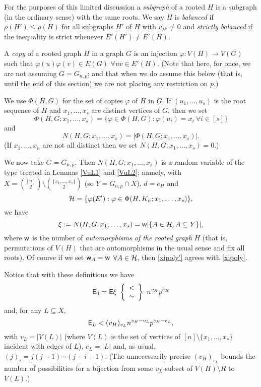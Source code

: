 \documentclass[letterpaper,11pt]{article}
\newcommand{\beq}[1]{\begin{equation}\label{#1}}
\newcommand{\enq}[0]{\end{equation}}
\newcommand{\sub}[0]{\subseteq}
\newcommand{\sm}[0]{\setminus}
\renewcommand{\dots}[0]{,\ldots,}
\newcommand{\h}[0]{{\cal H}}
\newcommand{\ra}[0]{\rightarrow}
\newcommand{\ww}{\mbox{{\sf w}}}
\newcommand{\0}[0]{\emptyset}
\newcommand{\C}[2]{{{#1}\choose{{#2}}}}
\newcommand{\vp}[0]{\varphi}
\begin{document}
For the purposes of this limited discussion a
{\em subgraph} of a rooted $H$ is a subgraph
(in the ordinary sense)
with the same roots.
We say $H$ is {\em balanced} if $\rho(H')\leq \rho(H)$
for all subgraphs $H'$ of $H$ with $v_{H'}\neq 0$
and
{\em strictly balanced} if the inequality is strict
whenever
$E'(H')\neq E'(H)$.






A {\em copy} of a rooted graph $H$ in a graph $G$
is an injection $\vp:V(H)\ra V(G)$ such that
$\vp(u)\vp(v)\in E(G)$ $\forall uv\in E'(H)$.
(Note that
here, for once, we are not assuming $G=G_{n,p}$;
and that when we do assume this below (that is, until the end of this section)
we are not placing any restriction on $p$.)


We use $\Phi(H,G)$
for the set of copies $\vp$ of $H$ in $G$.
If $(u_1\dots u_s)$ is the root sequence of $H$ and
$x_1\dots x_s$ are
distinct vertices of $G$, then we set
\[
\Phi(H,G;x_1\dots x_s)=\{\vp\in \Phi(H,G):
\vp(u_i)=x_i
~\forall i\in [s]\}
\]
and
\[
N(H,G;x_1\dots x_s)=|\Phi(H,G;x_1\dots x_s)|.
\]
(If $x_1\dots x_n$ are not all distinct then we set
$
N(H,G;x_1\dots x_s)=0.
$)



\medskip
We now take $G=G_{n,p}$.  Then
$
N(H,G;x_1\dots x_s)
$
is %
a random variable of the type treated in
Lemmas \ref{VuL1} and \ref{VuL2};
namely, with
$X=\C{[n]}{2}\sm \C{\{x_1\dots x_s\}}{2}$ (so $Y= G_{n,p}\cap X$), $d=e_H$ and
\[\h = \{\vp(E'):\vp\in \Phi(H,K_n;x_1\dots x_s)\},\]
we have
\beq{xipoly'}
\xi := N(H,G;x_1\dots x_s)
=\ww|\{A\in \h,A\sub Y\}|,
\enq
where $\ww$ is the number of {\em automorphisms
of the rooted graph} $H$ (that is,
permutations of $V(H)$ that are automorphisms in the usual sense
and fix all roots).
Of course if we set $\ww_A=\ww$ $\forall A\in\h$, then
\eqref{xipoly'} agrees with \eqref{xipoly}.

Notice that with these definitions we have
\beq{E0}
\E_0=\E\xi ~\left\{\begin{array}{c}
<\\\sim
\end{array}\right\}~
n^{v_H}p^{e_H}
\enq
and, for any $L\sub X$,
\beq{EL}
\E_L < (v_H)_{v_L}n^{v_H-v_L}p^{e_H-e_L},
\enq
with $v_L=|V(L)|$ (where $V(L)$ is the
set of vertices of $[n]\sm \{x_1\dots x_s\}$
incident with edges of $L$),
$e_L=|L|$ and, as usual,
$(j)_i=j(j-1)\cdots (j-i+1)$.
(The unnecessarily precise $(v_H)_{v_L}$ bounds the number of possibilities for a
bijection
from some $v_L$-subset of $V(H)\sm R$ to $V(L)$.)
\end{document}
